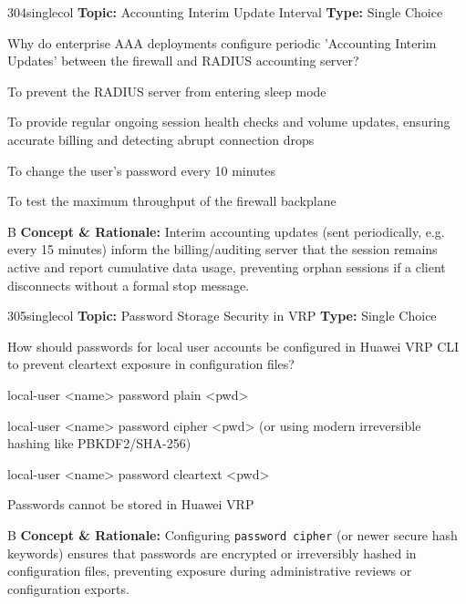 \begin{qcard}{304}{singlecol}
\textcolor{darkslate!75}{\small\textbf{Topic:} Accounting Interim Update Interval \hfill \textbf{Type:} Single Choice}\vspace{0.4em}\par
Why do enterprise AAA deployments configure periodic 'Accounting Interim Updates' between the firewall and RADIUS accounting server?
\begin{qoptions}
\item To prevent the RADIUS server from entering sleep mode
\item To provide regular ongoing session health checks and volume updates, ensuring accurate billing and detecting abrupt connection drops
\item To change the user's password every 10 minutes
\item To test the maximum throughput of the firewall backplane
\end{qoptions}
\end{qcard}
\nopagebreak
\begin{explainbox}{B}
\textbf{Concept \& Rationale:} Interim accounting updates (sent periodically, e.g. every 15 minutes) inform the billing/auditing server that the session remains active and report cumulative data usage, preventing orphan sessions if a client disconnects without a formal stop message.
\end{explainbox}

\begin{qcard}{305}{singlecol}
\textcolor{darkslate!75}{\small\textbf{Topic:} Password Storage Security in VRP \hfill \textbf{Type:} Single Choice}\vspace{0.4em}\par
How should passwords for local user accounts be configured in Huawei VRP CLI to prevent cleartext exposure in configuration files?
\begin{qoptions}
\item local-user \textless{}name\textgreater{} password plain \textless{}pwd\textgreater{}
\item local-user \textless{}name\textgreater{} password cipher \textless{}pwd\textgreater{} (or using modern irreversible hashing like PBKDF2/SHA-256)
\item local-user \textless{}name\textgreater{} password cleartext \textless{}pwd\textgreater{}
\item Passwords cannot be stored in Huawei VRP
\end{qoptions}
\end{qcard}
\nopagebreak
\begin{explainbox}{B}
\textbf{Concept \& Rationale:} Configuring \texttt{password cipher} (or newer secure hash keywords) ensures that passwords are encrypted or irreversibly hashed in configuration files, preventing exposure during administrative reviews or configuration exports.
\end{explainbox}


